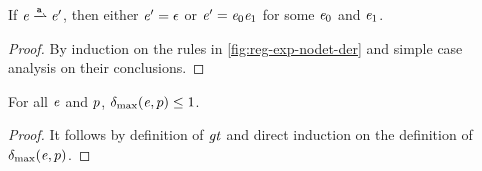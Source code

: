 \begin{lemma}\label{red-step}
 If $\re\parDer{\sym}{}\re'$, then either $\mathit {e}'=\mathtt {\epsilon}$ or $\mathit {e}'=\mathit {e}_0\mathit {e}_1$ for some $\mathit {e}_0$ and $\mathit {e}_1$.
 \begin{proof}
  By induction on the rules in \cref{fig:reg-exp-nodet-der} and simple case analysis on their conclusions.
 \end{proof}
\end{lemma}
\begin{lemma}\label{inc}
 For all $\mathit {e}$ and $p$, ${\delta_{\max}}({\mathit {e}},{p})\leq 1$.
 \begin{proof}
  It follows by definition of $\mathit{gt}$ and direct induction on the definition of ${\delta_{\max}}({\mathit {e}},{p})$.
 \end{proof}
\end{lemma}

